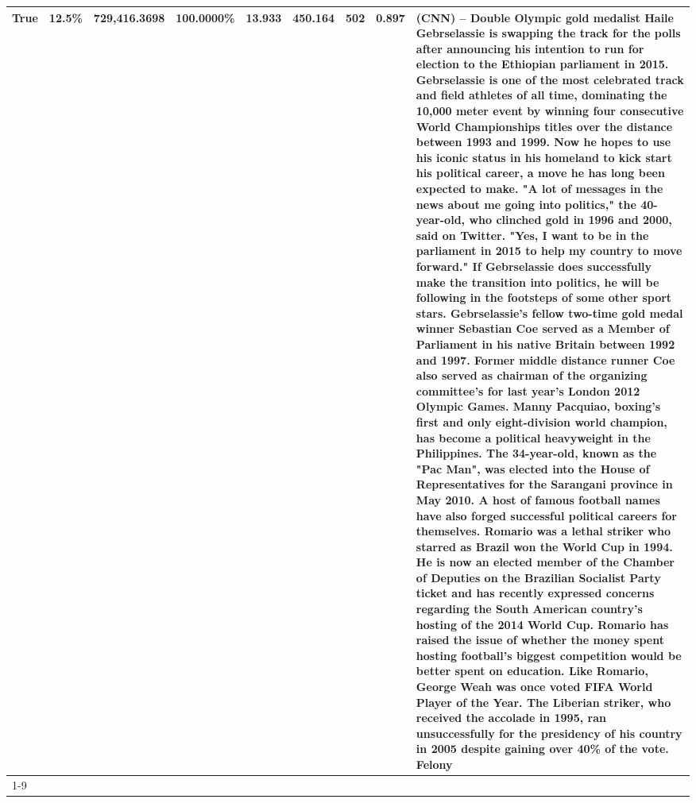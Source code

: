 \begin{table}[H]
{\begin{tabular}{lllrlllll}
True & 12.5\% & 729,416.3698 & \bfseries \color{red} 100.0000\% & 13.933 & 450.164 & 502 & 0.897 & (CNN) -- Double Olympic gold medalist Haile Gebrselassie is swapping the track for the polls after announcing his intention to run for election to the Ethiopian parliament in 2015. Gebrselassie is one of the most celebrated track and field athletes of all time, dominating the 10,000 meter event by winning four consecutive World Championships titles over the distance between 1993 and 1999. Now he hopes to use his iconic status in his homeland to kick start his political career, a move he has long been expected to make. "A lot of messages in the news about me going into politics," the 40-year-old, who clinched gold in 1996 and 2000, said on Twitter. "Yes, I want to be in the parliament in 2015 to help my country to move forward." If Gebrselassie does successfully make the transition into politics, he will be following in the footsteps of some other sport stars. Gebrselassie's fellow two-time gold medal winner Sebastian Coe served as a Member of Parliament in his native Britain between 1992 and 1997. Former middle distance runner Coe also served as chairman of the organizing committee's for last year's London 2012 Olympic Games. Manny Pacquiao, boxing's first and only eight-division world champion, has become a political heavyweight in the Philippines. The 34-year-old, known as the "Pac Man", was elected into the House of Representatives for the Sarangani province in May 2010. A host of famous football names have also forged successful political careers for themselves. Romario was a lethal striker who starred as Brazil won the World Cup in 1994. He is now an elected member of the Chamber of Deputies on the Brazilian Socialist Party ticket and has recently expressed concerns regarding the South American country's hosting of the 2014 World Cup. Romario has raised the issue of whether the money spent hosting football's biggest competition would be better spent on education. Like Romario, George Weah was once voted FIFA World Player of the Year. The Liberian striker, who received the accolade in 1995, ran unsuccessfully for the presidency of his country in 2005 despite gaining over 40\% of the vote. Felony \\
\cline{1-9}

\end{tabular}}
\end{table}
